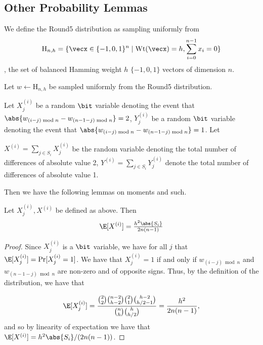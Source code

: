 \subsection{Other Probability Lemmas}
\label{sec:other-prob-lemm}


\begin{definition}
\label{def:round5_dist}
We define the Round5 distribution as sampling uniformly from 
\[\text{H}_{n,h} = \{\vecx \in \{-1,0,1\}^{n} \mid
  \text{Wt}(\vecx)=h,\sum_{i=0}^{n-1}x_i=0\}\], the set of balanced Hamming weight $h$ $\{-1,0,1\}$ vectors of dimension $n$.
\end{definition}

Let $w \gets \text{H}_{n,h}$ be sampled uniformly from the Round5
distribution.  


Let $X^{(i)}_j$ be a random $\bit$ variable denoting the event that $\abs{w_{(i-j)
  \bmod{n}} - w_{(n-1-j) \bmod{n}}}=2$, $Y^{(i)}_j$ be a random $\bit$ variable
denoting the event that $\abs{w_{(i-j)
  \bmod{n}} - w_{(n-1-j) \bmod{n}}}=1$. Let 

$X^{(i)}=\sum_{j \in S_{i}}X^{(i)}_j$ be the random variable denoting the total
number of differences of absolute value 2,  $Y^{(i)}=\sum_{j \in S_{i}}Y^{(i)}_j$
denote the total number of differences of absolute value 1. 

Then we have the following
lemmas on moments and such. 

\begin{lemma}
\label{lem:expof2}
Let $X^{(i)}_j, X^{(i)}$ be defined as above. Then 
\[\E[X^{(i)}]=\tfrac{h^2\abs{S_i}}{2n(n-1)}\]
\end{lemma}

\begin{proof}
Since $X^{(i)}_j$ is a $\bit$ variable, we have for all $j$ that
$\E[X^{(i)}_j]=\Pr[X^{(i)}_j=1]$. We have that $X^{(i)}_j=1$ if and only if
$w_{(i-j) \bmod{n}}$ and $w_{(n-1-j) \bmod{n}}$ are non-zero and of
opposite signs. Thus, by the definition of the distribution, we have that 

\[\E[X^{(i)}_j]=\frac{\binom{2}{2}\binom{n-2}{h-2}\binom{2}{1}\binom{h-2}{h/2-1}}{\binom{n}{h}
    \binom{h}{h/2}} = \frac{h^2}{2n(n-1)},\] and so by linearity of
expectation we have that $\E[X^{(i)}]=h^2\abs{S_i}/(2n(n-1))$.  
\end{proof}

